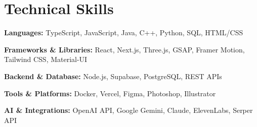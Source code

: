 \documentclass[10pt]{article}
\begin{document}
\section*{Technical Skills}
\textbf{Languages:} TypeScript, JavaScript, Java, C++, Python, SQL, HTML/CSS

\vspace{1pt}
\textbf{Frameworks \& Libraries:} React, Next.js, Three.js, GSAP, Framer Motion, Tailwind CSS, Material-UI

\vspace{1pt}
\textbf{Backend \& Database:} Node.js, Supabase, PostgreSQL, REST APIs

\vspace{1pt}
\textbf{Tools \& Platforms:} Docker, Vercel, Figma, Photoshop, Illustrator

\vspace{1pt}
\textbf{AI \& Integrations:} OpenAI API, Google Gemini, Claude, ElevenLabs, Serper API
\end{document}
